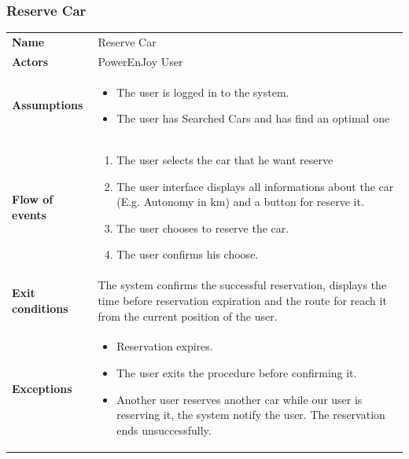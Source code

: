 \documentclass[english]{article}
\begin{document}
	\subsubsection{Reserve Car}
	\begin{center}
	\begin{tabular}{l||p{10cm}}
	\textbf{Name} 
		& Reserve Car\\ [8px]
	\textbf{Actors} 
		& PowerEnJoy User\\ [8px]
	\textbf{Assumptions} 
		& \begin{itemize}
			\item The user is logged in to the system.
			\item The user has Searched Cars and has find an optimal one
		\end{itemize}\\
	\textbf{Flow of events}
		& \begin{enumerate}
 			\item The user selects the car that he want reserve
 			\item The user interface displays all informations about the car (E.g. Autonomy in km) and a button for reserve it. 
			\item The user chooses to reserve the car. 
			\item The user confirms his choose.
		\end{enumerate}\\ 
	\textbf{Exit conditions}
		&The system confirms the successful reservation, displays the time before reservation expiration and the route for reach it from the current position of the user.\\ [8px]
	\textbf{Exceptions}
		& \begin{itemize}
			\item Reservation expires.
			\item The user exits the procedure before confirming it.
			\item Another user reserves another car while our user is reserving it, the system notify the user. The reservation ends unsuccessfully.
		\end{itemize}
	\end{tabular}
	\end{center}
\end{document}
